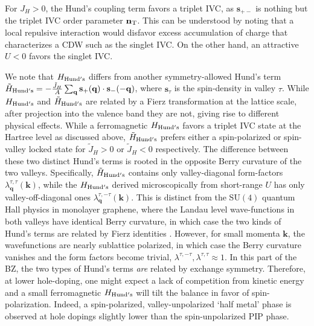 \documentclass[aps,pra,twocolumn,superscriptaddress,10pt,article,nofootinbib,showpacs,longbibliography]{revtex4-1}
\def \n{{\mathbf n}}
\def \q{{\mathbf q}}
\def \s{{\mathbf s}}
\begin{document}
For $J_H > 0$, the Hund's coupling term favors a triplet IVC, as $\s_{+-}$ is nothing but the triplet IVC order parameter $\n_{\rm T}$.  
This can be understood by noting that a local repulsive interaction would disfavor excess accumulation of charge that characterizes a CDW such as the singlet IVC.
On the other hand, an attractive $U < 0$ favors the singlet IVC. 

We note that $H_{\rm Hund's}$ differs from another symmetry-allowed Hund's term $\tilde{H}_{\rm Hund's} = - \frac{\tilde{J}_H}{A} \sum_{\q} \s_{+}(\q) \cdot \s_{-}(-\q)$, 
where $\mathbf{s}_\tau$ is the spin-density in valley $\tau$.
While $H_{\rm Hund's}$ and $\tilde{H}_{\rm Hund's}$ are related by a Fierz transformation at the lattice scale, after projection into the valence band they are not,  giving rise to different physical effects. 
While  a ferromagnetic $H_{\rm Hund's}$ favors a triplet IVC state at the Hartree level as discussed above,  $\tilde{H}_{\rm Hund's}$  prefers either a spin-polarized or spin-valley locked state for $\tilde{J}_H > 0$  or $\tilde{J}_H < 0$ respectively.
The difference between these two distinct Hund's terms is rooted in the opposite Berry curvature of the two valleys.
Specifically, $\tilde{H}_{\rm Hund's}$ contains only valley-diagonal form-factors $\lambda^{\tau,\tau}_{\mathbf{q}}(\mathbf{k})$, while the $H_{\rm Hund's}$ derived microscopically from short-range $U$ has only valley-off-diagonal ones $\lambda^{\tau,-\tau}_{\mathbf{q}}(\mathbf{k})$.
This is  distinct from the SU$(4)$ quantum Hall physics in monolayer graphene, where the Landau level wave-functions in both valleys have identical Berry curvature, in which case the two kinds of Hund's terms are related by Fierz identities \cite{Kharitonov}.
However, for small momenta $\mathbf{k}$, the wavefunctions are nearly sublattice polarized, in which case the Berry curvature vanishes and the form factors become trivial,  $\lambda^{\tau,-\tau},  \lambda^{\tau,\tau}  \approx 1$.
In this part of the BZ, the two types of Hund's terms \emph{are} related by exchange symmetry. 
Therefore, at lower hole-doping, one might expect a  lack of competition from kinetic energy and a small ferromagnetic $H_{\rm Hund's}$ will tilt the balance in favor of spin-polarization.
Indeed, a spin-polarized, valley-unpolarized `half metal' phase is observed at hole dopings slightly lower than the spin-unpolarized PIP phase.
\end{document}
